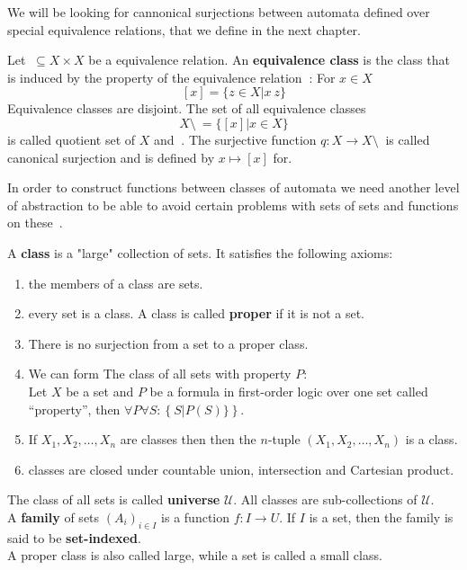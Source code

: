             We will be looking for cannonical surjections between automata defined over special equivalence relations, that we define in the next chapter.
            \begin{definition}
            Let $~ \subseteq X \times X$ be a equivalence relation. An \textbf{equivalence class} is the class that is induced by the property of the equivalence relation $~$: For $x \in X$
            \[ [x] = \{ z \in X | x ~ z\} \]
            Equivalence classes are disjoint. The set of all equivalence classes 
            \[ X \setminus ~ = \{ [x] | x \in X \} \]
            is called quotient set of $X$ and $~$. The surjective function $q: X \rightarrow X \setminus ~$ is called canonical surjection and is defined by $x \mapsto [x]$ for.
            \end{definition}
            
            In order to construct functions between classes of automata we need another level of abstraction to be able to avoid certain problems with sets of sets and functions on these~\autocite{CT2}.
            \begin{definition}\label{class}
             A \textbf{class} is a "large" collection of sets. It satisfies the following axioms:
             \begin{enumerate}
                \item the members of a class are sets.
                \item every set is a class. A class is called \textbf{proper} if it is not a set.
                \item There is no surjection from a set to a proper class.
                \item We can form The class of all sets with property $P$: \\
                    Let $X$ be a set and $P$ be a formula in first-order logic over one set called "`property"', then $\forall P \forall S: \left\{ S | P(S) \} \right\}$.
                 \item If $X_1, X_2, \dots, X_n$ are classes then then the $n$-tuple $(X_1, X_2, \dots, X_n)$ is a class.
                 \item classes are closed under countable union, intersection and Cartesian product.
             \end{enumerate}
            \end{definition}
            
            \begin{definition}
            The class of all sets is called \textbf{universe} $\mathcal{U}$. All classes are sub-collections of $\mathcal{U}$. \\
            A \textbf{family} of sets $(A_i)_{i \in I}$ is a function $f:I \rightarrow U$. If $I$ is a set, then the family is said to be \textbf{set-indexed}. \\
            A proper class is also called large, while a set is called a small class.
            \end{definition}
            
